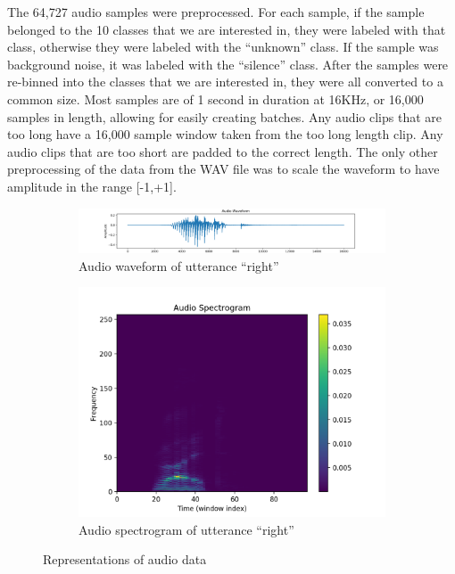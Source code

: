 \documentclass{article}
\begin{document}
The 64,727 audio samples were preprocessed. For each sample, if the
sample belonged to the 10 classes that we are interested in, they were
labeled with that class, otherwise they were labeled with the
``unknown'' class. If the sample was background noise, it was labeled
with the ``silence'' class. After the samples were re-binned into the
classes that we are interested in, they were all converted to a common
size. Most samples are of 1 second in duration at 16KHz, or 16,000
samples in length, allowing for easily creating batches. Any audio clips
that are too long have a 16,000 sample window taken from the too long
length clip. Any audio clips that are too short are padded to the correct
length. The only other preprocessing of the data from the WAV file was
to scale the waveform to have amplitude in the range [-1,+1].
\begin{figure}
  \begin{subfigure}{.5\linewidth}
    \includegraphics[width=\linewidth]{images/waveform-right}
    \caption{Audio waveform of utterance ``right''}
    \label{fig:wave_right}
  \end{subfigure}%
  \begin{subfigure}{.5\linewidth}
    \includegraphics[width=0.75\linewidth]{images/spectrogram-right}
    \caption{Audio spectrogram of utterance ``right''}
    \label{fig:spec_right}
  \end{subfigure}
  \caption{Representations of audio data}
\end{figure}
\end{document}
